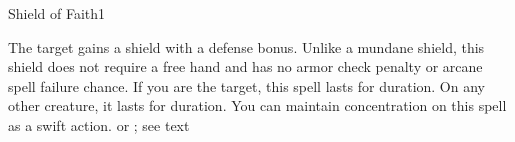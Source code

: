 \begin{spellsection}{Shield of Faith}{1}
\begin{spellheader}
    \begin{spelltargetinginfo}
    \end{spelltargetinginfo}
\end{spellheader}
\begin{spellcontent}
    \begin{spelleffects}
        \spelleffect The target gains a shield with a  defense bonus. \spellbonusscalingdescription Unlike a mundane shield, this shield does not require a free hand and has no armor check penalty or arcane spell failure chance.
        \spellspecial If you are the target, this spell lasts for \durlong duration. On any other creature, it lasts for \durshort duration. You can maintain concentration on this spell as a swift action.
        \spelldur \durshort or \durlong; see text \dismissable
    \end{spelleffects}
\end{spellcontent}
\begin{spellfooter}
\end{spellfooter}
\end{spellsection}


